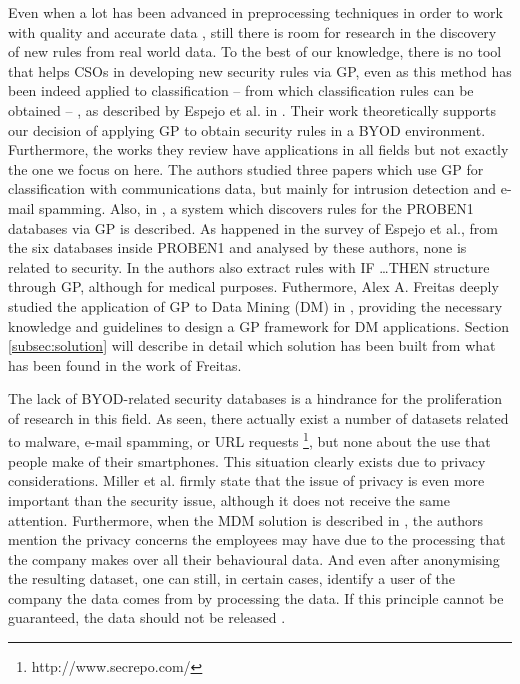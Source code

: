 \documentclass[a4paper,10pt,twocolumn,preprint,3p]{elsarticle}
\begin{document}
Even when a lot has been advanced in preprocessing techniques in order to work with quality and accurate data \cite{han2011data}, still there is room for research in the discovery of new rules from real world data. To the best of our knowledge, there is no tool that helps CSOs in
developing new security rules via GP, %
 even as this method has been
indeed applied to classification -- from which classification rules
can be obtained -- , as described by Espejo et al. in
\cite{espejo2010survey}. Their work theoretically supports our
decision of applying GP to obtain security rules in a BYOD
environment. Furthermore, the works they review have applications in
all fields but not exactly the one we focus on here. The authors
studied three papers which use GP for classification with
communications data, but mainly for intrusion detection and e-mail
spamming. Also, in \cite{DeFalco2002257}, a system which discovers
rules for the PROBEN1 databases via GP is described. As happened in
the survey of Espejo et al., from the six databases inside PROBEN1 and
analysed by these authors, none is related to security. In
\cite{Tsakonas2004195} the authors also extract rules with \textsc{IF
  \ldots THEN} structure through GP, although for medical purposes. Futhermore, Alex A. Freitas deeply studied the application of GP to Data Mining (DM) in \cite{freitas2002data}, providing the necessary knowledge and guidelines to design a GP framework for DM applications. Section \ref{subsec:solution} will describe in detail which solution has been built from what has been found in the work of Freitas.

The lack of BYOD-related security databases is a hindrance for the
proliferation of research in this field. As seen, there actually exist
a number of datasets related to malware, e-mail spamming, or URL
requests \footnote{http://www.secrepo.com/}, but none about the use
that people make of their smartphones. This situation clearly exists
due to privacy considerations. Miller et al. \cite{Miller201253}
firmly state that the issue of privacy is even more important than the
security issue, although it does not receive the same
attention. Furthermore, when the MDM solution is described in
\cite{ali2015analysis}, the authors mention the privacy concerns the
employees may have due to the processing that the company makes over
all their behavioural data. And even after anonymising the resulting
dataset, one can still, in certain cases, identify a user of the
company the data comes from by processing the data. If this principle
cannot be guaranteed, the data should not be released
\cite{boillat2014handbook}. 
\end{document}
